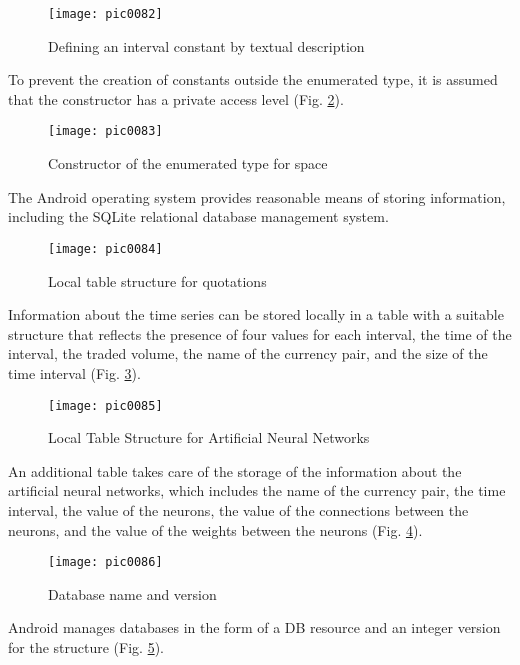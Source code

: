 \begin{figure}[h]
\centering
\texttt{[image: pic0082]}
\caption{Defining an interval constant by textual description}
\label{fig:pic0082}
\end{figure}
\FloatBarrier

To prevent the creation of constants outside the enumerated type, it is assumed that the constructor has a private access level (Fig. \ref{fig:pic0083}).

\begin{figure}[h]
\centering
\texttt{[image: pic0083]}
\caption{Constructor of the enumerated type for space}
\label{fig:pic0083}
\end{figure}
\FloatBarrier

The Android operating system provides reasonable means of storing information, including the SQLite relational database management system.

\begin{figure}[h]
\centering
\texttt{[image: pic0084]}
\caption{Local table structure for quotations}
\label{fig:pic0084}
\end{figure}
\FloatBarrier

Information about the time series can be stored locally in a table with a suitable structure that reflects the presence of four values for each interval, the time of the interval, the traded volume, the name of the currency pair, and the size of the time interval (Fig. \ref{fig:pic0084}).

\begin{figure}[h]
\centering
\texttt{[image: pic0085]}
\caption{Local Table Structure for Artificial Neural Networks}
\label{fig:pic0085}
\end{figure}
\FloatBarrier

An additional table takes care of the storage of the information about the artificial neural networks, which includes the name of the currency pair, the time interval, the value of the neurons, the value of the connections between the neurons, and the value of the weights between the neurons (Fig. \ref{fig:pic0085}).

\begin{figure}[h]
\centering
\texttt{[image: pic0086]}
\caption{Database name and version}
\label{fig:pic0086}
\end{figure}
\FloatBarrier

Android manages databases in the form of a DB resource and an integer version for the structure (Fig. \ref{fig:pic0086}).

